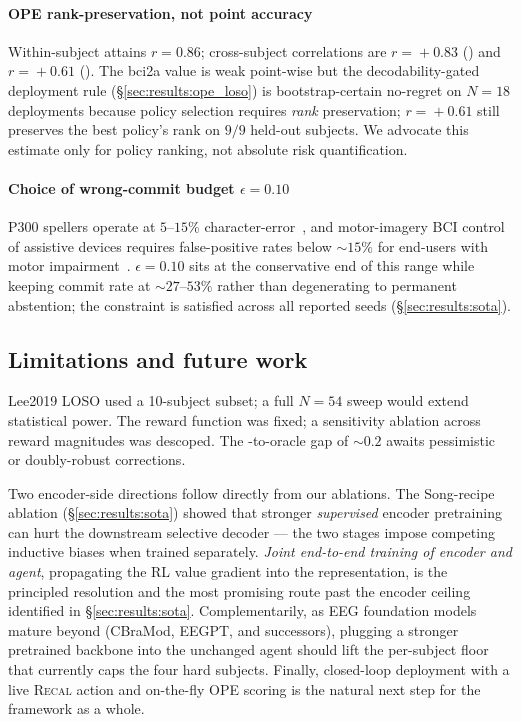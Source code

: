 \paragraph*{OPE rank-preservation, not point accuracy}
Within-subject \fqe{} attains $r\!=\!0.86$; cross-subject
correlations are $r\!=\!+0.83$ (\bcib) and $r\!=\!+0.61$
(\bcia). The bci2a value is weak point-wise but the
decodability-gated deployment rule
(\S\ref{sec:results:ope_loso}) is bootstrap-certain no-regret on
$N\!=\!18$ deployments because policy selection requires
\emph{rank} preservation; $r\!=\!+0.61$ still preserves the best
policy's rank on $9/9$ held-out subjects. We advocate this
estimate only for policy ranking, not absolute risk
quantification.

\paragraph*{Choice of wrong-commit budget $\epsilon\!=\!0.10$}
P300 spellers operate at $5$--$15\%$
character-error~\cite{Townsend2010P300checkerboard,
Sellers2006P300speller}, and motor-imagery BCI control of
assistive devices requires false-positive rates below $\sim\!15\%$
for end-users with motor impairment~\cite{Tonin2022WheelchairBCI,
Wolpaw2002ITR}. $\epsilon\!=\!0.10$ sits at the conservative end
of this range while keeping commit rate at
$\sim\!27$--$53\%$ rather than degenerating to permanent
abstention; the constraint is satisfied across all reported seeds
(\S\ref{sec:results:sota}).

\subsection{Limitations and future work}\label{sec:disc:limitations}

Lee2019 LOSO used a 10-subject subset; a full $N\!=\!54$ sweep
would extend statistical power. The reward function was fixed; a
sensitivity ablation across reward magnitudes was descoped. The
\fqe{}-to-oracle gap of $\sim\!0.2$ awaits pessimistic or
doubly-robust corrections.

Two encoder-side directions follow directly from our ablations.
The Song-recipe ablation (\S\ref{sec:results:sota}) showed that
stronger \emph{supervised} encoder pretraining can hurt the
downstream selective decoder --- the two stages impose competing
inductive biases when trained separately. \emph{Joint end-to-end
training of encoder and agent}, propagating the RL value gradient
into the representation, is the principled resolution and the
most promising route past the encoder ceiling identified in
\S\ref{sec:results:sota}. Complementarily, as EEG foundation
models mature beyond \labram{} (CBraMod, EEGPT, and successors),
plugging a stronger pretrained backbone into the unchanged agent
should lift the per-subject floor that currently caps the four
hard \bcia{} subjects. Finally, closed-loop deployment with a
live \textsc{Recal} action and on-the-fly OPE scoring is the
natural next step for the framework as a whole.
